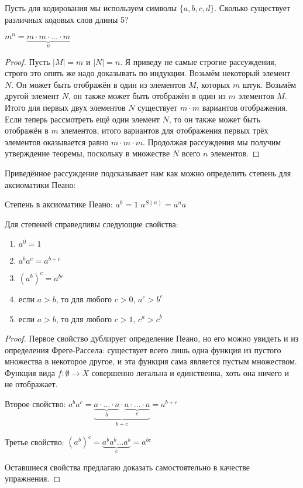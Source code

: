 \begin{exercise}
Пусть для кодирования мы используем символы $\{a, b, c, d\}$. Сколько существует различных кодовых слов длины 5?
\end{exercise}

\begin{thm}
$m^n = \underbrace{m\cdot m \cdot \ldots \cdot m}_n$
\end{thm}
\begin{proof}
Пусть $|M| = m$ и $|N| = n$. Я приведу не самые строгие рассуждения, строго это опять же надо доказывать по индукции. Возьмём некоторый элемент $N$. Он может быть отображён в один из элементов $M$, которых $m$ штук. Возьмём другой элемент $N$, он также может быть отображён в один из $m$ элементов $M$. Итого для первых двух элементов $N$ существует $m\cdot m$ вариантов отображения. Если теперь рассмотреть ещё один элемент $N$, то он также может быть отображён в $m$ элементов, итого вариантов для отображения первых трёх элементов оказывается равно $m\cdot m\cdot m$. Продолжая рассуждения мы получим утверждение теоремы, поскольку в множестве $N$ всего $n$ элементов.
\end{proof}

Приведённое рассуждение подсказывает нам как можно определить степень для аксиоматики Пеано:

\begin{definition}
Степень в аксиоматике Пеано:\newline
$a^0 = 1$\newline
$a^{S(n)} = a^na$
\end{definition}

\begin{thm}
Для степеней справедливы следующие свойства:
\begin{enumerate}
\item $a^0 = 1$
\item $a^b a^c = a^{b+c}$
\item $(a^b)^c = a^{bc}$
\item если $a > b$, то для любого $c > 0$, $a^c > b^c$
\item если $a > b$, то для любого $c > 1$, $c^a > c^b$
\end{enumerate}
\end{thm}
\begin{proof}
Первое свойство дублирует определение Пеано, но его можно увидеть и из определения Фреге-Рассела: существует всего лишь одна функция из пустого множества в некоторое другое, и эта функция сама является пустым множеством. Функция вида $f:\emptyset\to X$ совершенно легальна и единственна, хоть она ничего и не отображает.

Второе свойство: $a^ba^c = \underbrace{\underbrace{a\cdot\ldots\cdot a}_b \cdot \underbrace{a \cdot\ldots \cdot a}_c}_{b+c} = a^{b+c}$

Третье свойство: $(a^b)^c = \underbrace{a^ba^b\ldots a^b}_c = a^{bc}$

Оставшиеся свойства предлагаю доказать самостоятельно в качестве упражнения.
\end{proof}


